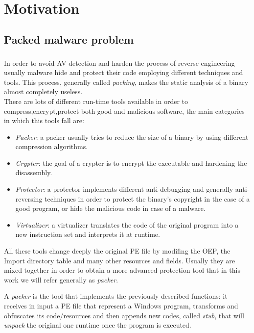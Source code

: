 \chapter{Motivation}
\label{chapter2}
\thispagestyle{empty}

\section{Packed malware problem}
\paragraph{}
In order to avoid \ac{AV} detection and harden the process of reverse engineering usually malware hide and protect their code employing different techniques and tools. This process, generally called \textit{packing}, makes the static analysis of a binary almost completely useless.\\There are lots of different run-time tools available in order to compress,encrypt,protect both good and malicious software, the main categories in which this tools fall are:
\begin{itemize}
\item \emph{Packer}: a packer usually tries to reduce the size of a binary by using different compression algorithms.
\item \emph{Crypter}: the goal of a crypter is to encrypt the executable and hardening the disassembly.
\item \emph{Protector}: a protector implements different anti-debugging and generally anti-reversing techniques in order to protect the binary's copyright in the case of a good program, or hide the malicious code in case of a malware.
\item \emph{Virtualizer}: a virtualizer translates the code of the original program into a new  instruction set and  interprets it at runtime.
\end{itemize}

All these tools change deeply the original PE file by modifing the OEP, the Import directory table and many other resources and fields. Usually they are mixed together in order to obtain a more advanced protection tool that in this work we will refer generally as \textit{packer}.

A \textit{packer} is the tool that implements the previously described functions: it receives in input a PE file that represent a Windows program, transforms and obfuscates its code/resources and then appends new codes, called \textit{stub}, that will \textit{unpack} the original one runtime once the program is executed.\\\\

